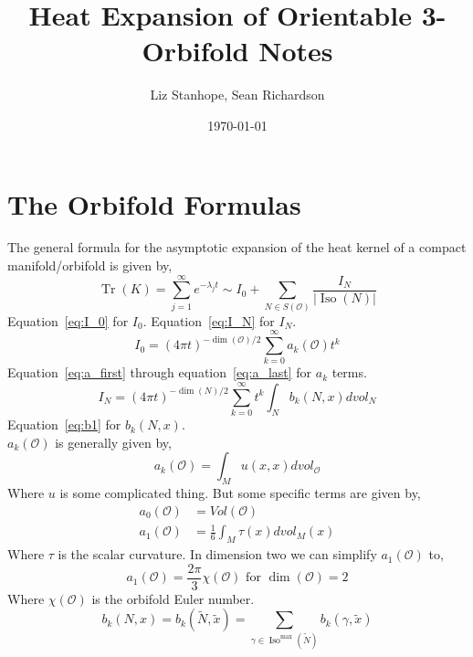 \documentclass[12pt]{article}
\newcommand{\myabs}[1]{\vert#1\vert}
\theoremstyle{definition}
\DeclareMathOperator{\iso}{Iso}
\DeclareMathOperator{\trace}{Tr}
\begin{document}
\title{Heat Expansion of Orientable 3-Orbifold Notes}
\author{Liz Stanhope, Sean Richardson}
\date{\today}
\maketitle

\section{The Orbifold Formulas}
The general formula for the asymptotic expansion of the heat kernel of a compact manifold/orbifold is given by,
\begin{equation}
    \trace(K) = \sum_{j=1}^{\infty}e^{-\lambda_{j} t}\sim I_0+\sum_{N \in S(\mathcal{O})}\frac{I_N}{\myabs{\iso(N)}}
    \label{eq:trace}
\end{equation}
Equation~\ref{eq:I_0} for $I_0$. Equation~\ref{eq:I_N} for $I_N$.
\begin{equation}
    I_0 = {(4\pi t)}^{-\dim(\mathcal{O})/2}\sum_{k=0}^{\infty}a_k(\mathcal{O})t^k
    \label{eq:I_0}
\end{equation}
Equation~\ref{eq:a_first} through equation~\ref{eq:a_last} for $a_k$ terms.
\begin{equation}
    I_N = {(4\pi t)}^{-\dim(N)/2}\sum_{k=0}^{\infty}t^k\int_{N}b_k(N,x)dvol_N
    \label{eq:I_N}
\end{equation}
Equation~\ref{eq:b1} for $b_k(N,x)$.\\
$a_k(\mathcal{O})$ is generally given by,
\begin{equation}
    a_k(\mathcal{O})=\int_M u(x,x)dvol_\mathcal{O}
    \label{eq:a_first}
\end{equation}
Where $u$ is some complicated thing. But some specific terms are given by,
\begin{align}
    a_0(\mathcal{O})&= Vol(\mathcal{O})\\
    a_1(\mathcal{O})&= \frac{1}{6}\int_M \tau(x)dvol_M(x)
\end{align}
Where $\tau$ is the scalar curvature. In dimension two we can simplify $a_1(\mathcal{O})$ to,
\begin{equation}
    a_1(\mathcal{O})=\frac{2\pi}{3}\chi(\mathcal{O}) \text{ for } \dim(\mathcal{O}) = 2
    \label{eq:a_last}
\end{equation}
Where $\chi({\mathcal{O}})$ is the orbifold Euler number.
\begin{equation}
    b_k(N,x)=b_k(\tilde{N},\tilde{x})
    =\sum_{\gamma \in \iso^{\max}(\tilde{N})} b_k(\gamma,\tilde{x})
    \label{eq:b1}
\end{equation}
\end{document}
